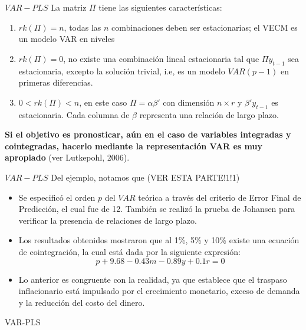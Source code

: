 \documentclass{beamer}
\newcommand{\?}{?`}
\begin{document}
\begin{frame}{$VAR-PLS$}
  La matriz $\Pi$ tiene las siguientes caracter\'isticas:
  \begin{enumerate}
  \item $rk(\Pi)=n$, todas las $n$ combinaciones deben ser
    estacionarias; el VECM es un modelo VAR en niveles
  \item $rk(\Pi)=0$, no existe una combinaci\'on lineal estacionaria
    tal que $\Pi y_{t-1}$ sea estacionaria, excepto la soluci\'on
    trivial, i.e, es un modelo $VAR(p-1)$ en primeras diferencias.
  \item $0<rk(\Pi)<n$, en este caso $\Pi=\alpha \beta'$ con
    dimensi\'on $n\times r$ y $\beta' y_{t-1}$ es estacionaria. Cada
    columna de $\beta$ representa una relaci\'on de largo plazo.
  \end{enumerate}

  \textbf{Si el objetivo es pronosticar, a\'un en el caso de variables
  integradas y cointegradas, hacerlo mediante la representaci\'on VAR
  es muy apropiado} (ver Lutkepohl, 2006).
\end{frame}

\begin{frame}{$VAR-PLS$}
  Del ejemplo, notamos que (VER ESTA PARTE!1!1)
  \begin{itemize}
  \item Se especific\'o el orden $p$ del $VAR$ te\'orica a trav\'es
    del criterio de Error Final de Predicci\'on, el cual fue de
    12. Tambi\'en se realiz\'o la prueba de Johansen para verificar la
    presencia de relaciones de largo plazo.
  \item Los resultados obtenidos mostraron que al 1\%, 5\% y 10\%
    existe una ecuaci\'on de cointegraci\'on, la cual est\'a dada por
    la siguiente expresi\'on:
    \begin{displaymath}
      p+9.68-0.43m-0.89y+0.1r=0
    \end{displaymath}
  \item Lo anterior es congruente con la realidad, ya que establece
    que el traspaso inflacionario est\'a impulsado por el crecimiento
    monetario, exceso de demanda y la reducci\'on del costo del
    dinero. 
  \end{itemize}
\end{frame}

\begin{frame}{}
  \begin{block}{}
    \begin{center}
      \vspace{3mm}
      {\Large VAR-PLS}
      \vspace{3mm}
    \end{center}
  \end{block}
\end{frame}
\end{document}
